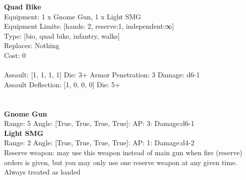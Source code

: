 \noindent 

{\bf Quad Bike } \\
Equipment: 1 x Gnome Gun, 1 x Light SMG \\
Equipment Limits: [hands: 2, reserve:1, independent:∞] \\
Type: [bio, quad bike, infantry, walks] \\
Replaces: Nothing \\
Cost: 0\\
\ \\
Assault: [1, 1, 1, 1] Die: 3+ Armor Penetration: 3 Damage: d6-1 \\
Assault Deflection: [1, 0, 0, 0] Die: 5+\\
\indent  
\ \\

\ \\
{\bf Gnome Gun } \\



Range: 5  Angle: [True, True, True, True]: AP: 3: Damage:d6-1 \\




{\bf Light SMG } \\



Range: 2  Angle: [True, True, True, True]: AP: 1: Damage:d4-2 \\
Reserve weapon: may use this weapon instead of main gun when fire (reserve) orders is given, but you may only use one reserve weapon at any given time.\\ 
Always treated as loaded\\ 




 
\ \\



